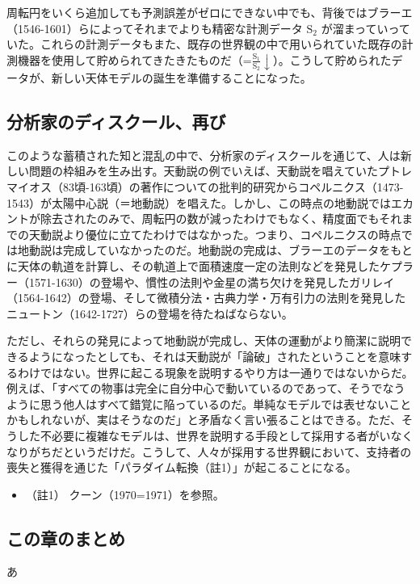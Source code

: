 周転円をいくら追加しても予測誤差がゼロにできない中でも、背後ではブラーエ（1546-1601）らによってそれまでよりも精密な計測データ
\(\textrm{S}_2\)
が溜まっていっていた。これらの計測データもまた、既存の世界観の中で用いられていた既存の計測機器を使用して貯められてきたきたものだ（=\(\frac{\textrm{S}_1}{\textrm{S}_2}\downarrow\)）。こうして貯められたデータが、新しい天体モデルの誕生を準備することになった。

\subsection{分析家のディスクール、再び}\label{ux5206ux6790ux5bb6ux306eux30c7ux30a3ux30b9ux30afux30fcux30ebux518dux3073}

このような蓄積された知と混乱の中で、分析家のディスクールを通じて、人は新しい問題の枠組みを生み出す。天動説の例でいえば、天動説を唱えていたプトレマイオス（83頃-163頃）の著作についての批判的研究からコペルニクス（1473-1543）が太陽中心説（＝地動説）を唱えた。しかし、この時点の地動説ではエカントが除去されたのみで、周転円の数が減ったわけでもなく、精度面でもそれまでの天動説より優位に立てたわけではなかった。つまり、コペルニクスの時点では地動説は完成していなかったのだ。地動説の完成は、ブラーエのデータをもとに天体の軌道を計算し、その軌道上で面積速度一定の法則などを発見したケプラー（1571-1630）の登場や、慣性の法則や金星の満ち欠けを発見したガリレイ（1564-1642）の登場、そして微積分法・古典力学・万有引力の法則を発見したニュートン（1642-1727）らの登場を待たねばならない。

ただし、それらの発見によって地動説が完成し、天体の運動がより簡潔に説明できるようになったとしても、それは天動説が「論破」されたということを意味するわけではない。世界に起こる現象を説明するやり方は一通りではないからだ。例えば、「すべての物事は完全に自分中心で動いているのであって、そうでなうように思う他人はすべて錯覚に陥っているのだ。単純なモデルでは表せないことかもしれないが、実はそうなのだ」と矛盾なく言い張ることはできる。ただ、そうした不必要に複雑なモデルは、世界を説明する手段として採用する者がいなくなりがちだというだけだ。こうして、人々が採用する世界観において、支持者の喪失と獲得を通じた「パラダイム転換（註1）」が起こることになる。

\begin{itemize}
\tightlist
\item
  （註1） クーン（1970=1971）\cite{Khun}を参照。
\end{itemize}

\subsection{この章のまとめ}\label{ux3053ux306eux7ae0ux306eux307eux3068ux3081}

あ
